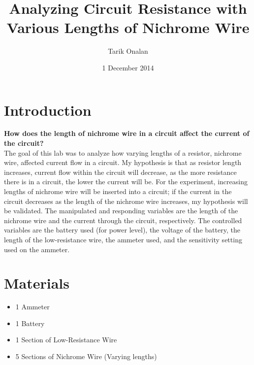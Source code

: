 \documentclass[a4paper]{article}
\title{Analyzing Circuit Resistance with Various Lengths of Nichrome Wire}
\date{1 December 2014}
\author{Tarik Onalan}
\numberwithin{equation}{subsection}
\begin{document}
    \maketitle
    \section{Introduction}
        \textbf{How does the length of nichrome wire in a circuit affect the current
        of the circuit?}\\
        The goal of this lab was to analyze how varying lengths of a resistor, nichrome
        wire, affected current flow in a circuit. My hypothesis is that as resistor
        length increases, current flow within the circuit will decrease, as the more
        resistance there is in a circuit, the lower the current will be. For the experiment,
        increasing lengths of nichrome wire will be inserted into a circuit; if the
        current in the circuit decreases as the length of the nichrome wire increases,
        my hypothesis will be validated. The manipulated and responding variables are
        the length of the nichrome wire and the current through the circuit, respectively.
        The controlled variables are the battery used (for power level), the voltage of
        the battery, the length of the low-resistance wire, the ammeter used, and the
        sensitivity setting used on the ammeter.

    \section{Materials}
        \begin{itemize}
            \item 1 Ammeter
            \item 1 Battery
            \item 1 Section of Low-Resistance Wire
            \item 5 Sections of Nichrome Wire (Varying lengths)
        \end{itemize}
\end{document}

